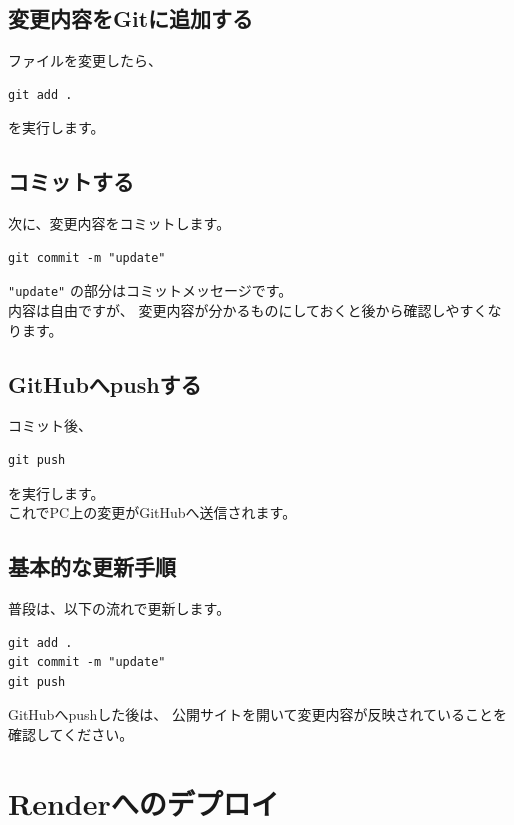 \documentclass[a4paper,11pt]{ltjsarticle}
\begin{document}
\subsection{変更内容をGitに追加する}

ファイルを変更したら、

\begin{lstlisting}
git add .
\end{lstlisting}

を実行します。


\subsection{コミットする}

次に、変更内容をコミットします。

\begin{lstlisting}
git commit -m "update"
\end{lstlisting}

\texttt{"update"} の部分はコミットメッセージです。\\
内容は自由ですが、
変更内容が分かるものにしておくと後から確認しやすくなります。


\subsection{GitHubへpushする}

コミット後、

\begin{lstlisting}
git push
\end{lstlisting}

を実行します。\\
これでPC上の変更がGitHubへ送信されます。

\subsection{基本的な更新手順}

普段は、以下の流れで更新します。

\begin{lstlisting}
git add .
git commit -m "update"
git push
\end{lstlisting}

GitHubへpushした後は、
公開サイトを開いて変更内容が反映されていることを確認してください。


\section{Renderへのデプロイ}
\end{document}
